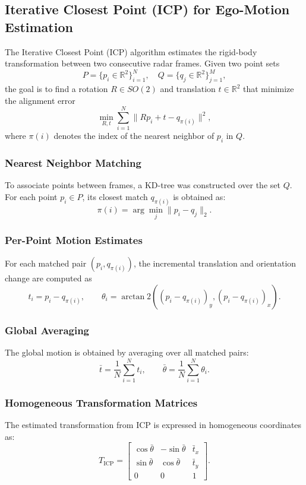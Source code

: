 \subsection{Iterative Closest Point (ICP) for Ego-Motion Estimation}
\label{subsec:icp}

The Iterative Closest Point (ICP) algorithm estimates the rigid-body transformation 
between two consecutive radar frames. Given two point sets
\[
P = \{p_i \in \mathbb{R}^2 \}_{i=1}^{N}, \quad
Q = \{q_j \in \mathbb{R}^2 \}_{j=1}^{M},
\]
the goal is to find a rotation $R \in SO(2)$ and translation $t \in \mathbb{R}^2$ that minimize the alignment error
\[
\min_{R,t} \sum_{i=1}^N \lVert R p_i + t - q_{\pi(i)} \rVert^2,
\]
where $\pi(i)$ denotes the index of the nearest neighbor of $p_i$ in $Q$.

\subsubsection*{Nearest Neighbor Matching}
To associate points between frames, a KD-tree was constructed over the set $Q$.  
For each point $p_i \in P$, its closest match $q_{\pi(i)}$ is obtained as:
\[
\pi(i) = \arg\min_j \lVert p_i - q_j \rVert_2.
\]

\subsubsection*{Per-Point Motion Estimates}
For each matched pair $(p_i, q_{\pi(i)})$, the incremental translation and orientation change are computed as
\[
t_i = p_i - q_{\pi(i)}, \qquad
\theta_i = \arctan2\!\left( (p_i - q_{\pi(i)})_y, (p_i - q_{\pi(i)})_x \right).
\]

\subsubsection*{Global Averaging}
The global motion is obtained by averaging over all matched pairs:
\[
\bar{t} = \frac{1}{N} \sum_{i=1}^N t_i, \qquad
\bar{\theta} = \frac{1}{N} \sum_{i=1}^N \theta_i.
\]

\subsubsection*{Homogeneous Transformation Matrices}
The estimated transformation from ICP is expressed in homogeneous coordinates as:
\[
T_{\text{ICP}} =
\begin{bmatrix}
\cos\bar{\theta} & -\sin\bar{\theta} & \bar{t}_x \\
\sin\bar{\theta} &  \cos\bar{\theta} & \bar{t}_y \\
0 & 0 & 1
\end{bmatrix}.
\]

